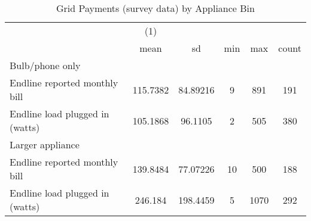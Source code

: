 \begin{table}[htbp]\centering
\def\sym#1{\ifmmode^{#1}\else\(^{#1}\)\fi}
\caption{Grid Payments (survey data) by Appliance Bin\label {tab1}}
\begin{tabular}{l*{1}{ccccc}}
\toprule
                    &\multicolumn{1}{c}{(1)}&            &            &            &            \\
                    &        mean&          sd&         min&         max&       count\\
\midrule
Bulb/phone only     &            &            &            &            &            \\
Endline reported monthly bill&    115.7382&    84.89216&           9&         891&         191\\
Endline load plugged in (watts)&    105.1868&     96.1105&           2&         505&         380\\
\midrule
Larger appliance    &            &            &            &            &            \\
Endline reported monthly bill&    139.8484&    77.07226&          10&         500&         188\\
Endline load plugged in (watts)&     246.184&    198.4459&           5&        1070&         292\\
\bottomrule
\end{tabular}
\end{table}
